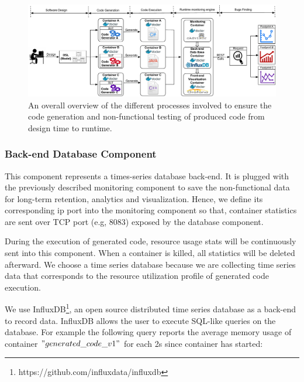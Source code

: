\begin{figure}[h]
	\includegraphics[width=1\linewidth]{Ressources/background2.pdf}
	\caption{An overall overview of the different processes involved to ensure the code generation and non-functional testing of produced code from design time to runtime.}
\end{figure}
\subsubsection{Back-end Database Component}
This component represents a times-series database back-end. It is plugged with the previously described monitoring component to save the non-functional data for long-term retention, analytics and visualization. Hence, we define its corresponding ip port into the monitoring component so that, container statistics are sent over TCP port (e.g, 8083) exposed by the database component.

During the execution of generated code, resource usage stats will be continuously sent into this component. When a container is killed, all statistics will be deleted afterward. We choose a time series database because we are collecting time series data that corresponds to the resource utilization profile of generated code execution.

We use InfluxDB\footnote{https://github.com/influxdata/influxdb}, an open source distributed time series database as a back-end to record data. InfluxDB allows the user to execute SQL-like queries on the database. For example the following query reports the average memory usage of container $"generated\_code\_v1"$ for each 2s since container has started:

